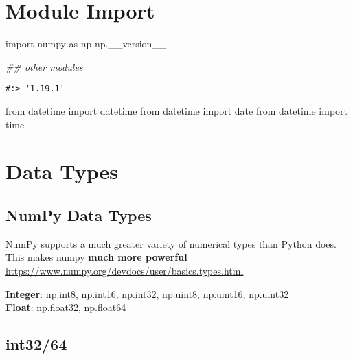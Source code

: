 \documentclass[
]{book}
\newenvironment{Shaded}{\begin{snugshade}}{\end{snugshade}}
\newcommand{\CommentTok}[1]{\textcolor[rgb]{0.37,0.37,0.37}{\textit{#1}}}
\newcommand{\ImportTok}[1]{#1}
\newcommand{\NormalTok}[1]{#1}
\begin{document}
\hypertarget{module-import-1}{%
\section{Module Import}\label{module-import-1}}

\begin{Shaded}
\begin{Highlighting}[]
\ImportTok{import}\NormalTok{ numpy }\ImportTok{as}\NormalTok{ np}
\NormalTok{np.\_\_version\_\_}

\CommentTok{\#\# other modules}
\end{Highlighting}
\end{Shaded}

\begin{verbatim}
#:> '1.19.1'
\end{verbatim}

\begin{Shaded}
\begin{Highlighting}[]
\ImportTok{from}\NormalTok{ datetime }\ImportTok{import}\NormalTok{ datetime}
\ImportTok{from}\NormalTok{ datetime }\ImportTok{import}\NormalTok{ date}
\ImportTok{from}\NormalTok{ datetime }\ImportTok{import}\NormalTok{ time}
\end{Highlighting}
\end{Shaded}

\hypertarget{data-types}{%
\section{Data Types}\label{data-types}}

\hypertarget{numpy-data-types}{%
\subsection{NumPy Data Types}\label{numpy-data-types}}

NumPy supports a much greater variety of numerical types than Python does. This makes numpy \textbf{much more powerful} \url{https://www.numpy.org/devdocs/user/basics.types.html}

\textbf{Integer}: np.int8, np.int16, np.int32, np.uint8, np.uint16, np.uint32\\
\textbf{Float}: np.float32, np.float64

\hypertarget{int3264}{%
\subsection{int32/64}\label{int3264}}
\end{document}
